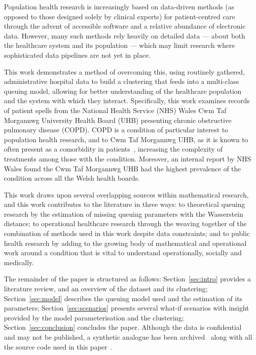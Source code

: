 \documentclass[11pt]{article}
\begin{document}
Population health research is increasingly based on data-driven methods (as
opposed to those designed solely by clinical experts) for patient-centred care
through the advent of accessible software and a relative abundance of electronic
data. However, many such methods rely heavily on detailed data — about both the
healthcare system and its population — which may limit research where
sophisticated data pipelines are not yet in place.

This work demonstrates a method of overcoming this, using routinely gathered,
administrative hospital data to build a clustering that feeds into a multi-class
queuing model, allowing for better understanding of the healthcare population
and the system with which they interact. Specifically, this work examines
records of patient spells from the National Health Service (NHS) Wales Cwm Taf
Morgannwg University Health Board (UHB) presenting chronic obstructive pulmonary
disease (COPD). COPD is a condition of particular interest to population health
research, and to Cwm Taf Morgannwg UHB, as it is known to often present as a
comorbidity in patients~\cite{Houben2019}, increasing the complexity of
treatments among those with the condition. Moreover, an internal report by NHS
Wales found the Cwm Taf Morgannwg UHB had the highest prevalence of the
condition across all the Welsh health boards.

This work draws upon several overlapping sources within mathematical research,
and this work contributes to the literature in three ways: to theoretical
queuing research by the estimation of missing queuing parameters with the
Wasserstein distance; to operational healthcare research through the weaving
together of the combination of methods used in this work despite data
constraints; and to public health research by adding to the growing body of
mathematical and operational work around a condition that is vital to understand
operationally, socially and medically.

The remainder of the paper is structured as follows: Section~\ref{sec:intro}
provides a literature review, and an overview of the dataset and its clustering;
Section~\ref{sec:model} describes the queuing model used and the estimation of
its parameters; Section~\ref{sec:scenarios} presents several what-if scenarios
with insight provided by the model parameterisation and the clustering;
Section~\ref{sec:conclusion} concludes the paper. Although the data is
confidential and may not be published, a synthetic analogue has been
archived~\cite{Wilde2020synthetic} along with all the source code used in this
paper~\cite{Wilde2020github}.
\end{document}
